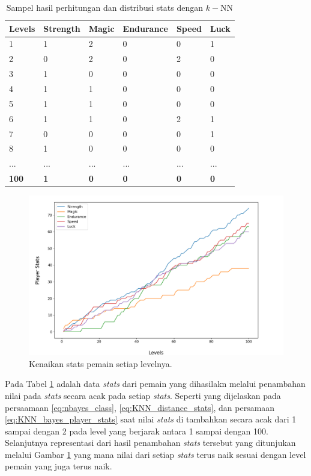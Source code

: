 \begin{longtable}{|l|l|l|l|l|l|}
	\caption{Sampel hasil perhitungan dan distribusi stats dengan $k-$NN}
	\label{tb:player_battle_stats}\\
	\hline
	\rowcolor[HTML]{C0C0C0} 
	\textbf{Levels} & \textbf{Strength} & \textbf{Magic} & \textbf{Endurance} & \textbf{Speed} & \textbf{Luck} \\ \hline
	1 & 1 & 2 & 0 & 0 & 1 \\ \hline
	2 & 0 & 2 & 0 & 2 & 0 \\ \hline
	3 & 1 & 0 & 0 & 0 & 0 \\ \hline
	4 & 1 & 1 & 0 & 0 & 0 \\ \hline
	5 & 1 & 1 & 0 & 0 & 0 \\ \hline
	6 & 1 & 1 & 0 & 2 & 1 \\ \hline
	7 & 0 & 0 & 0 & 0 & 1 \\ \hline
	8 & 1 & 0 & 0 & 0 & 0 \\ \hline
	... & ... & ... & ... & ... & ... \\ \hline
	\textbf{100} & \textbf{1} & \textbf{0} & \textbf{0} & \textbf{0} & \textbf{0} \\ \hline
\end{longtable}

\begin{figure} [!h] \centering
	\includegraphics[scale=0.50]{img/PlayerStatsDistrib.png}
	\caption{Kenaikan stats pemain setiap levelnya.}
	\label{fig:stats_player}
\end{figure}

Pada Tabel \ref{tb:player_battle_stats} adalah data \textit{stats} dari pemain yang dihasilakn melalui penambahan nilai pada \textit{stats} secara acak pada setiap \textit{stats}. Seperti yang dijelaskan pada persaamaan \ref{eq:nbayes_class}, \ref{eq:KNN_distance_stats}, dan persamaan \ref{eq:KNN_bayes_player_stats} saat nilai \textit{stats} di tambahkan secara acak dari 1 sampai dengan 2 pada level yang berjarak antara 1 sampai dengan 100. Selanjutnya representasi dari hasil penambahan \textit{stats} tersebut yang ditunjukan melalui Gambar \ref{fig:stats_player} yang mana nilai dari setiap \textit{stats} terus naik sesuai dengan level pemain yang juga terus naik. 
\vspace{1ex}


